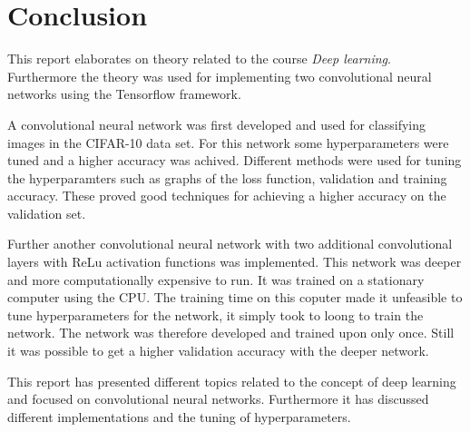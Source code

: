 \chapter{Conclusion}
\label{chp:conc}

This report elaborates on theory related to the course \emph{Deep learning}. Furthermore the theory was used for implementing two convolutional neural networks using the Tensorflow framework.

A  convolutional neural network was first developed and used for classifying images in the CIFAR-10 data set. For this network some hyperparameters were tuned and a higher accuracy was achived. Different methods were used for tuning the hyperparamters such as graphs of the loss function, validation and training accuracy. These proved good techniques for achieving a higher accuracy on the validation set.

Further another convolutional neural network with two additional convolutional layers with ReLu activation functions was implemented. This network was deeper and more computationally expensive to run. It was trained on a stationary computer using the CPU. The training time on this coputer made it unfeasible to tune hyperparameters for the network, it simply took to loong to train the network. The network was therefore developed and trained upon only once. Still it was possible to get a higher validation accuracy with the deeper network.

This report has presented different topics related to the concept of deep learning and focused on convolutional neural networks. Furthermore it has discussed different implementations and the tuning of hyperparameters. 